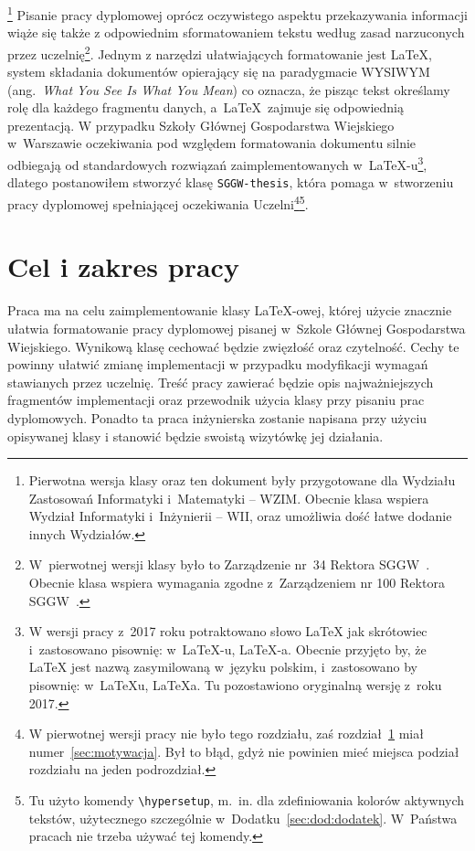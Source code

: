 \documentclass{SGGW-thesis}
\begin{document}
\footnote{Pierwotna wersja klasy oraz ten dokument były przygotowane dla Wydziału Zastosowań Informatyki i~Matematyki -- WZIM. Obecnie klasa wspiera Wydział Informatyki i~Inżynierii -- WII, oraz umożliwia dość łatwe dodanie innych Wydziałów.}%
Pisanie pracy dyplomowej oprócz oczywistego aspektu przekazywania informacji wiąże się także z odpowiednim sformatowaniem tekstu według zasad narzuconych przez uczelnię\footnote{W~pierwotnej wersji klasy było to Zarządzenie nr~34 Rektora SGGW~\cite{wymagania}. Obecnie klasa wspiera wymagania zgodne z~Zarządzeniem nr 100 Rektora SGGW~\cite{wymagania-100}.}. Jednym z narzędzi ułatwiających formatowanie jest \LaTeX, system składania dokumentów opierający się na paradygmacie WYSIWYM (ang.\ {\em What You See Is What You Mean}) co oznacza, że pisząc tekst określamy rolę dla każdego fragmentu danych, a~\LaTeX\ zajmuje się odpowiednią prezentacją. W przypadku Szkoły Głównej Gospodarstwa Wiejskiego w~Warszawie oczekiwania pod względem formatowania dokumentu silnie odbiegają od standardowych rozwiązań zaimplementowanych w~\LaTeX-u\footnote{W wersji pracy z~2017 roku potraktowano słowo \LaTeX{} jak skrótowiec i~zastosowano pisownię: w~\LaTeX-u, \LaTeX-a. Obecnie przyjęto by, że \LaTeX{} jest nazwą zasymilowaną w~języku polskim, i~zastosowano by pisownię: w~\LaTeX{}u, \LaTeX{}a. Tu pozostawiono oryginalną wersję z~roku 2017.}, dlatego postanowiłem stworzyć klasę {\tt SGGW-thesis}, która pomaga w~stworzeniu pracy dyplomowej spełniającej oczekiwania Uczelni\footnote{W pierwotnej wersji pracy nie było tego rozdziału, zaś rozdział~\ref{sec:cel-zakres} miał numer~\ref{sec:motywacja}. Był to błąd, gdyż nie powinien mieć miejsca podział rozdziału na jeden podrozdział.}\footnote{Tu użyto komendy {\tt \textbackslash{}hypersetup}, m.\ in. dla zdefiniowania kolorów aktywnych tekstów, użytecznego szczególnie w~Dodatku~\ref{sec:dod:dodatek}. W~Państwa pracach nie trzeba używać tej komendy.}.


\section{Cel i zakres pracy}
\label{sec:cel-zakres}
Praca ma na celu zaimplementowanie klasy \LaTeX-owej, której użycie znacznie ułatwia formatowanie pracy dyplomowej pisanej w~Szkole Głównej Gospodarstwa Wiejskiego. Wynikową
klasę cechować będzie zwięzłość oraz czytelność. Cechy te powinny ułatwić zmianę implementacji w przypadku modyfikacji wymagań stawianych przez uczelnię. Treść pracy zawierać
będzie opis najważniejszych fragmentów implementacji oraz przewodnik użycia klasy przy pisaniu prac dyplomowych. Ponadto ta praca inżynierska zostanie napisana przy użyciu
opisywanej klasy i stanowić będzie swoistą wizytówkę jej działania.
\end{document}
